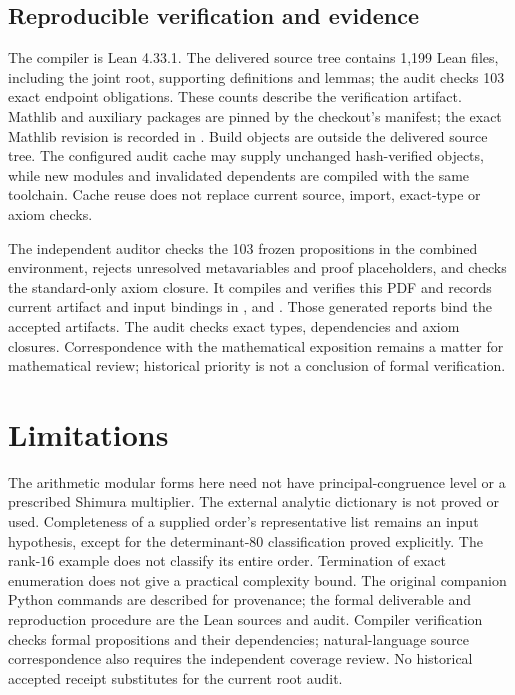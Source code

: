 \documentclass[11pt]{article}
\theoremstyle{remark}\newtheorem{remark}[theorem]{Remark}
\begin{document}
\subsection{Reproducible verification and evidence}
The compiler is Lean 4.33.1. The delivered source tree contains 1,199 Lean
files, including the joint root, supporting definitions and lemmas; the
audit checks 103 exact endpoint obligations. These counts describe the
verification artifact. Mathlib and auxiliary packages are pinned by the
checkout's manifest; the exact Mathlib revision is recorded in
. Build objects are outside the delivered source tree.
The configured audit cache may supply unchanged hash-verified objects, while
new modules and invalidated dependents are compiled with the same toolchain.
Cache reuse does not replace current source, import, exact-type or axiom checks.

The independent auditor checks the 103 frozen propositions in the combined
environment, rejects unresolved metavariables and proof placeholders, and
checks the standard-only axiom closure. It compiles and verifies this PDF
and records current artifact and input bindings in
,  and
. Those generated reports bind the accepted artifacts. The audit checks
exact types, dependencies and axiom closures. Correspondence with the
mathematical exposition remains a matter for mathematical review;
historical priority is not a conclusion of formal verification.

\section{Limitations}
The arithmetic modular forms here need not have principal-congruence level
or a prescribed Shimura multiplier. The external analytic dictionary is not
proved or used. Completeness of a supplied order's representative list remains
an input hypothesis, except for the determinant-$80$ classification proved
explicitly. The rank-$16$ example does not classify its entire order.
Termination of exact enumeration does not give a practical complexity bound.
The original companion Python commands are described for provenance; the
formal deliverable and reproduction procedure are the Lean sources and audit.
Compiler verification checks formal propositions and their dependencies;
natural-language source correspondence also requires the independent coverage
review. No historical accepted receipt substitutes for the current root audit.
\end{document}
